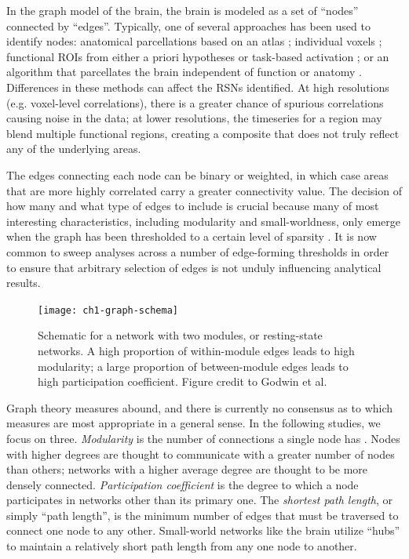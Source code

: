 In the graph model of the brain, the brain is modeled as a set of ``nodes'' connected by ``edges''. Typically, one of several approaches has been used to identify nodes: anatomical parcellations based on an atlas \citep{Supekar2008, Liu2008, Lynall2010}; individual voxels \citep{Fair2007}; functional ROIs from either a priori hypotheses or task-based activation \citep{VandenHeuvel2010}; or an algorithm that parcellates the brain independent of function or anatomy \citep{Goni2014}. Differences in these methods can affect the RSNs identified. At high resolutions (e.g. voxel-level correlations), there is a greater chance of spurious correlations causing noise in the data; at lower resolutions, the timeseries for a region may blend multiple functional regions, creating a composite that does not truly reflect any of the underlying areas. 

The edges connecting each node can be binary or weighted, in which case areas that are more highly correlated carry a greater connectivity value. The decision of how many and what type of edges to include is crucial because many of most interesting characteristics, including modularity and small-worldness, only emerge when the graph has been thresholded to a certain level of sparsity \citep{Moussa2012}. It is now common to sweep analyses across a number of edge-forming thresholds in order to ensure that arbitrary selection of edges is not unduly influencing analytical results.

\begin{figure}[t]
    \centering
    \texttt{[image: ch1-graph-schema]}
    \caption[Schematic for a network with two modules.]{Schematic for a network with two modules, or resting-state networks. A high proportion of within-module edges leads to high modularity; a large proportion of between-module edges leads to high participation coefficient. Figure credit to Godwin et al. \citep{Godwin2016}}
    \label{fig:ch1-graph-schema}
\end{figure}

Graph theory measures abound, and there is currently no consensus as to which measures are most appropriate in a general sense. In the following studies, we focus on three. \textit{Modularity} is the number of connections a single node has \citep{Sporns2013}. Nodes with higher degrees are thought to communicate with a greater number of nodes than others; networks with a higher average degree are thought to be more densely connected. \textit{Participation coefficient} is the degree to which a node participates in networks other than its primary one. The \textit{shortest path length}, or simply ``path length'', is the minimum number of edges that must be traversed to connect one node to any other. Small-world networks like the brain utilize ``hubs'' to maintain a relatively short path length from any one node to another. 


